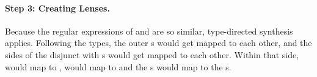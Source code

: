 \documentclass[numbers,10pt,preprint\ifanon ,nocopyrightspace\fi]{sigplanconf}
\begin{document}
\paragraph*{Step 3: Creating Lenses.}
Because the regular expressions of   and  are so
similar, type-directed synthesis applies.
Following the types, the outer s
would get mapped to each other, and the sides of the disjunct with
\StarRegexType{}s
would get mapped to each other.  Within that side,  would map to
,  would map to  and the \StarRegexType{}s would map to the
\StarRegexType{}s.

%
%  
%
\end{document}
